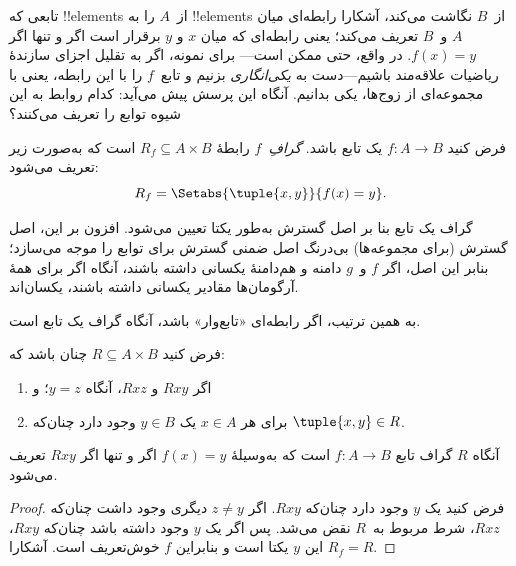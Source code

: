 \documentclass[../../../include/open-logic-section]{subfiles}
\begin{document}


\begin{explain}
تابعی که !!{element}s از~$A$ را به !!{element}s از~$B$
نگاشت می‌کند، آشکارا رابطه‌ای میان $A$ و~$B$ تعریف می‌کند؛ یعنی رابطه‌ای
که میان $x$ و $y$ برقرار است اگر و تنها اگر $f(x) = y$. در واقع، حتی ممکن است---
برای نمونه، اگر به تقلیل اجزای سازندهٔ ریاضیات علاقه‌مند باشیم---دست به
\emph{یکی‌انگاری} بزنیم و تابع~$f$ را با این رابطه، یعنی با مجموعه‌ای از
زوج‌ها، یکی بدانیم. آنگاه این پرسش پیش می‌آید:
کدام روابط به این شیوه توابع را تعریف می‌کنند؟
\end{explain}

\begin{defn} فرض کنید $f\colon A \to B$ یک تابع باشد.
\emph{گرافِ}~$f$ رابطهٔ $R_f \subseteq A \times B$ است که
به‌صورت زیر تعریف می‌شود:
\[
R_f = \Setabs{\tuple{x,y}}{f(x) = y}.
\]
\end{defn}

\begin{explain}
گراف یک تابع بنا بر اصل گسترش به‌طور یکتا تعیین می‌شود.
افزون بر این، اصل گسترش (برای مجموعه‌ها) بی‌درنگ
اصل ضمنی گسترش برای توابع را موجه می‌سازد؛
بنابر این اصل، اگر $f$ و~$g$ دامنه و هم‌دامنهٔ یکسانی داشته باشند، آنگاه اگر
برای همهٔ آرگومان‌ها مقادیر یکسانی داشته باشند، یکسان‌اند.

به همین ترتیب، اگر رابطه‌ای «تابع‌وار» باشد، آنگاه گراف یک تابع است.
\end{explain}

\begin{prop}
فرض کنید $R \subseteq A \times B$ چنان باشد که:
\begin{enumerate}
\item اگر $Rxy$ و $Rxz$، آنگاه $y = z$؛ و
\item برای هر $x \in A$ یک $y \in B$ وجود دارد چنان‌که $\tuple{x,
y} \in R$.
\end{enumerate}
آنگاه $R$ گراف تابع $f\colon A \to B$ است که به‌وسیلهٔ
$f(x) = y$ اگر و تنها اگر $Rxy$ تعریف می‌شود.
\end{prop}

\begin{proof}
فرض کنید یک $y$ وجود دارد چنان‌که $Rxy$. اگر $z \neq
y$ دیگری وجود داشت چنان‌که $Rxz$، شرط مربوط به~$R$ نقض می‌شد. پس اگر
یک $y$ وجود داشته باشد چنان‌که $Rxy$، این $y$ یکتا است و بنابراین $f$
خوش‌تعریف است. آشکارا $R_f = R$.
\end{proof}
\end{document}
